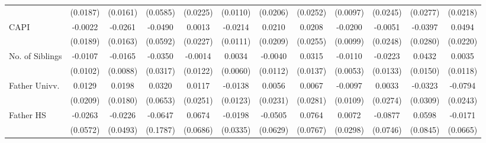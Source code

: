 \begin{table}[htbp]
\begin{tabular}{l*{11}{c}}
            &    (0.0187)         &    (0.0161)         &    (0.0585)         &    (0.0225)         &    (0.0110)         &    (0.0206)         &    (0.0252)         &    (0.0097)         &    (0.0245)         &    (0.0277)         &    (0.0218)         \\
\addlinespace
CAPI        &     -0.0022         &     -0.0261         &     -0.0490         &      0.0013         &     -0.0214         &      0.0210         &      0.0208         &     -0.0200\sym{*}  &     -0.0051         &     -0.0397         &      0.0494\sym{*}  \\
            &    (0.0189)         &    (0.0163)         &    (0.0592)         &    (0.0227)         &    (0.0111)         &    (0.0209)         &    (0.0255)         &    (0.0099)         &    (0.0248)         &    (0.0280)         &    (0.0220)         \\
\addlinespace
No. of Siblings&     -0.0107         &     -0.0165         &     -0.0350         &     -0.0014         &      0.0034         &     -0.0040         &      0.0315\sym{*}  &     -0.0110\sym{*}  &     -0.0223         &      0.0432\sym{**} &      0.0035         \\
            &    (0.0102)         &    (0.0088)         &    (0.0317)         &    (0.0122)         &    (0.0060)         &    (0.0112)         &    (0.0137)         &    (0.0053)         &    (0.0133)         &    (0.0150)         &    (0.0118)         \\
\addlinespace
Father Univv.&      0.0129         &      0.0198         &      0.0320         &      0.0117         &     -0.0138         &      0.0056         &      0.0067         &     -0.0097         &      0.0033         &     -0.0323         &     -0.0794\sym{**} \\
            &    (0.0209)         &    (0.0180)         &    (0.0653)         &    (0.0251)         &    (0.0123)         &    (0.0231)         &    (0.0281)         &    (0.0109)         &    (0.0274)         &    (0.0309)         &    (0.0243)         \\
\addlinespace
Father HS   &     -0.0263         &     -0.0226         &     -0.0647         &      0.0674         &     -0.0198         &     -0.0505         &      0.0764         &      0.0072         &     -0.0877         &      0.0598         &     -0.0171         \\
            &    (0.0572)         &    (0.0493)         &    (0.1787)         &    (0.0686)         &    (0.0335)         &    (0.0629)         &    (0.0767)         &    (0.0298)         &    (0.0746)         &    (0.0845)         &    (0.0665)         \\

\end{tabular}
\end{table}
